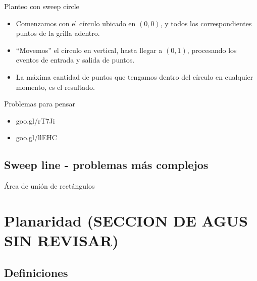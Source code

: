 \documentclass[compress]{beamer}
\begin{document}
\begin{frame}{Planteo con sweep circle}

\begin{itemize}
    \item Comenzamos con el círculo ubicado en $(0,0)$, y todos los correspondientes puntos de la grilla adentro.
    \item ``Movemos'' el círculo en vertical, hasta llegar a $(0,1)$, procesando los eventos de entrada y salida de puntos.
    \item La máxima cantidad de puntos que tengamos dentro del círculo en cualquier momento, es el resultado.
\end{itemize}

\pause


\end{frame}

\begin{frame}{Problemas para pensar}

\begin{itemize}
\item goo.gl/rT7Ji
\item goo.gl/llEHC
\end{itemize}

\end{frame}

\subsection{Sweep line - problemas más complejos}
\begin{frame}{Área de unión de rectángulos}

\end{frame}


\section{Planaridad (SECCION DE AGUS SIN REVISAR)}

\subsection{Definiciones}
\end{document}
